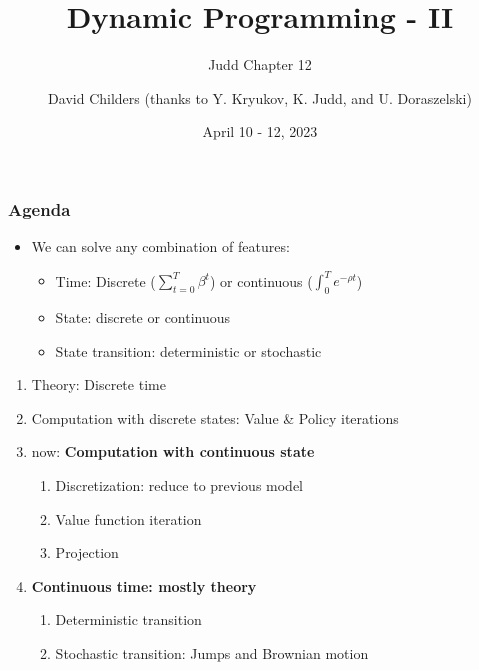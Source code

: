 \documentclass[bigger,handout]{beamer}
\begin{document}
\title[47-809: Dyn.Prog.]{Dynamic Programming - II}
\subtitle{Judd Chapter 12}
\author[David Childers]{David Childers (thanks to Y. Kryukov, K. Judd, and U. Doraszelski)}
\date[Apr 10-12]{April 10 - 12, 2023}
\maketitle

\begin{frame}%
\frametitle{Agenda}

\begin{itemize}
\item We can solve any combination of features:

\begin{itemize}
\item Time: Discrete ($\sum_{t=0}^{T}\beta ^{t}$) or continuous ($%
\int_{0}^{T}e^{-\rho t}$)

\item State: discrete or continuous

\item State transition: deterministic or stochastic
\end{itemize}
\end{itemize}

\begin{enumerate}
\item Theory: Discrete time

\item Computation with discrete states: Value \& Policy iterations

\item now: \textbf{Computation with continuous state}

\begin{enumerate}
\item Discretization: reduce to previous model

\item Value function iteration

\item Projection
\end{enumerate}

\item \textbf{Continuous time: mostly theory}

\begin{enumerate}
\item Deterministic transition

\item Stochastic transition: Jumps and Brownian motion
\end{enumerate}
\end{enumerate}

\end{frame}%
\end{document}
